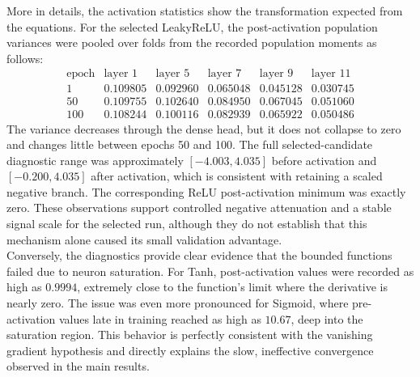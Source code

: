 More in details, the activation statistics show the transformation expected from the equations. For the selected LeakyReLU, the post-activation population variances were pooled over folds from the recorded population moments as follows:
\begin{equation}
\begin{array}{c|ccccc}
\text{epoch} & \text{layer 1} & \text{layer 5} & \text{layer 7} & \text{layer 9} & \text{layer 11} \\
\hline
1   & 0.109805 & 0.092960 & 0.065048 & 0.045128 & 0.030745 \\
50  & 0.109755 & 0.102640 & 0.084950 & 0.067045 & 0.051060 \\
100 & 0.108244 & 0.100116 & 0.082939 & 0.065922 & 0.050486
\end{array}
\label{eq:04_activation_variance}
\end{equation}
The variance decreases through the dense head, but it does not collapse to zero and changes little between epochs 50 and 100. The full selected-candidate diagnostic range was approximately $[-4.003,4.035]$ before activation and $[-0.200,4.035]$ after activation, which is consistent with retaining a scaled negative branch. The corresponding ReLU post-activation minimum was exactly zero. These observations support controlled negative attenuation and a stable signal scale for the selected run, although they do not establish that this mechanism alone caused its small validation advantage.\\

Conversely, the diagnostics provide clear evidence that the bounded functions failed due to neuron saturation. For Tanh, post-activation values were recorded as high as $0.9994$, extremely close to the function's limit where the derivative is nearly zero. The issue was even more pronounced for Sigmoid, where pre-activation values late in training reached as high as $10.67$, deep into the saturation region. This behavior is perfectly consistent with the vanishing gradient hypothesis and directly explains the slow, ineffective convergence observed in the main results.\\

